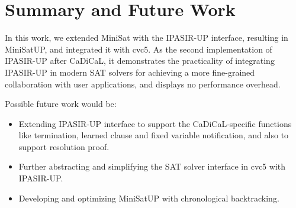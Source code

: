 \chapter{Summary and Future Work}

In this work, we extended MiniSat with the IPASIR-UP interface, resulting in MiniSatUP, and integrated it with cvc5. As the second implementation of IPASIR-UP after CaDiCaL, it demonstrates the practicality of integrating IPASIR-UP in modern SAT solvers for achieving a more fine-grained collaboration with user applications, and displays no performance overhead.

Possible future work would be:

\begin{itemize}
  \item Extending IPASIR-UP interface to support the CaDiCaL-specific functions like termination, learned clause and fixed variable notification, and also to support resolution proof.
  \item Further abstracting and simplifying the SAT solver interface in cvc5 with IPASIR-UP.
  \item Developing and optimizing MiniSatUP with chronological backtracking.
\end{itemize}
